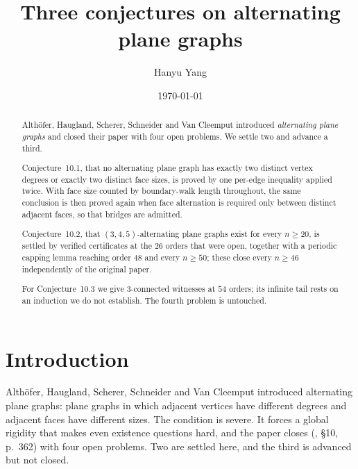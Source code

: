 \documentclass[11pt,a4paper]{amsart}
\theoremstyle{plain}
\theoremstyle{definition}
\begin{document}
\title[Three conjectures on alternating plane graphs]
      {Three conjectures on alternating plane graphs}

\author{Hanyu Yang}

\date{\today}


\begin{abstract}
Alth\"ofer, Haugland, Scherer, Schneider and Van Cleemput introduced
\emph{alternating plane graphs} and closed their paper with four open problems.
We settle two and advance a third.

Conjecture~10.1, that no alternating plane graph has exactly two distinct vertex
degrees or exactly two distinct face sizes, is proved by one per-edge inequality
applied twice. With face size counted by boundary-walk length throughout, the
same conclusion is then proved again when face alternation is required only
between distinct adjacent faces, so that bridges are admitted.

Conjecture~10.2, that $(3,4,5)$-alternating plane graphs exist for every
$n \ge 20$, is settled by verified certificates at the $26$ orders that were
open, together with a periodic capping lemma reaching order $48$ and every
$n \ge 50$; these close every $n \ge 46$ independently of the original paper.

For Conjecture~10.3 we give $3$-connected witnesses at $54$ orders; its infinite
tail rests on an induction we do not establish. The fourth problem is untouched.
\end{abstract}

\maketitle

\section{Introduction}

Alth\"ofer, Haugland, Scherer, Schneider and Van Cleemput \cite{AHSSV2015}
introduced alternating plane graphs: plane graphs in which adjacent vertices
have different degrees and adjacent faces have different sizes. The condition is
severe. It forces a global rigidity that makes even existence questions hard,
and the paper closes (\cite{AHSSV2015}, \S10, p.~362) with four open problems.
Two are settled here, and the third is advanced but not closed.
\end{document}
